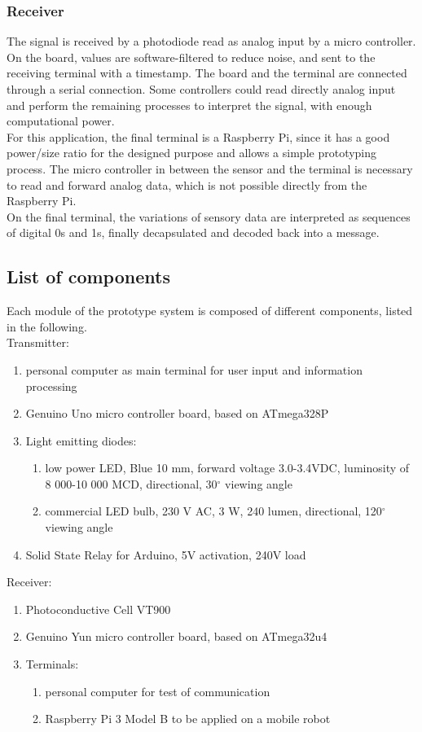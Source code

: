 \subsubsection{Receiver}
The signal is received by a photodiode read as analog input by a micro controller.
On the board, values are software-filtered to reduce noise, and sent to the receiving terminal with a timestamp.
The board and the terminal are connected through a serial connection.
Some controllers could read directly analog input and perform the remaining processes to interpret the signal, with enough computational power.\\ 
For this application, the final terminal is a Raspberry Pi, since it has a good power/size ratio for the designed purpose and allows a simple prototyping process. The micro controller in between the sensor and the terminal is necessary to read and forward analog data, which is not possible directly from the Raspberry Pi.\\
On the final terminal, the variations of sensory data are interpreted as sequences of digital 0s and 1s, finally decapsulated and decoded back into a message.

\subsection{List of components}
\label{components}
Each module of the prototype system is composed of different components, listed in the following.\\
Transmitter:
\begin{enumerate}
\item personal computer as main terminal for user input and information processing
\item Genuino Uno micro controller board, based on ATmega328P \cite{genuinouno}
\item Light emitting diodes:
\begin{enumerate}
\item low power LED, Blue 10 mm, forward voltage 3.0-3.4VDC, luminosity of 8 000-10 000 MCD, directional, 30$^{\circ}$ viewing angle
\item commercial LED bulb, 230 V AC, 3 W, 240 lumen, directional, 120$^{\circ}$ viewing angle
\end{enumerate}
\item Solid State Relay for Arduino, 5V activation, 240V load
\end{enumerate}
Receiver:
\begin{enumerate}
\item Photoconductive Cell VT900
\item Genuino Yun micro controller board, based on ATmega32u4 \cite{arduinoyun}
\item Terminals:
\begin{enumerate}
\item personal computer for test of communication
\item Raspberry Pi 3 Model B to be applied on a mobile robot
\end{enumerate}
\end{enumerate}

